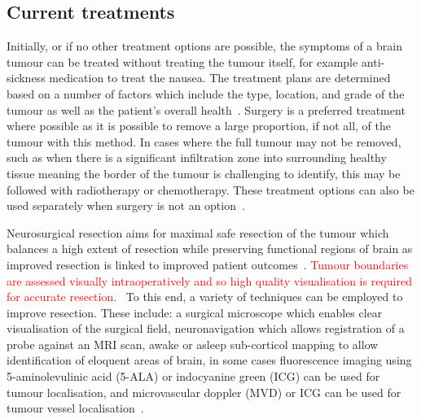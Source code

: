 \subsection{Current treatments}\label{sec:introtumourtreatments}
Initially, or if no other treatment options are possible, the symptoms of a brain tumour can be treated without treating the tumour itself, for example anti-sickness medication to treat the nausea. The treatment plans are determined based on a number of factors which include the type, location, and grade of the tumour as well as the patient's overall health~\citep{NationalHealthService2023}. Surgery is a preferred treatment where possible as it is possible to remove a large proportion, if not all, of the tumour with this method. In cases where the full tumour may not be removed, such as when there is a significant infiltration zone into surrounding healthy tissue meaning the border of the tumour is challenging to identify, this may be followed with radiotherapy or chemotherapy. These treatment options can also be used separately when surgery is not an option~\citep{MacmillanCancerSupport2019}. 

Neurosurgical resection aims for maximal safe resection of the tumour which balances a high extent of resection while preserving functional regions of brain as improved resection is linked to improved patient outcomes~\citep{Chanbour2022}. \textcolor{red}{Tumour boundaries are assessed visually intraoperatively and so high quality visualisation is required for accurate resection.~\citep{Chanbour2022}}  To this end, a variety of techniques can be employed to improve resection. These include: a surgical microscope which enables clear visualisation of the surgical field, neuronavigation which allows registration of a probe against an MRI scan, awake or asleep sub-corticol mapping to allow identification of eloquent areas of brain, in some cases fluorescence imaging using 5-aminolevulinic acid (5-ALA) or indocyanine green (ICG) can be used for tumour localisation, and microvascular doppler (MVD) or ICG can be used for tumour vessel localisation~\citep{Chanbour2022, Catapano2018}.

